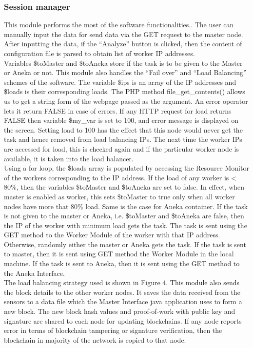 \documentclass[AMA,STIX1COL]{WileyNJD-v2}
\begin{document}
\subsubsection{Session manager}
This module performs the most of the software functionalities.. The user can manually input the data for send data via the GET request to the master node. After inputting the data, if the “Analyze” button is clicked, then the content of configuration file is parsed to obtain list of worker IP addresses. \\
Variables \$toMaster and \$toAneka store if the task is to be given to the Master or Aneka or not. This module also handles the “Fail over” and “Load Balancing” schemes of the software. The variable \$ips is an array of the IP addresses and \$loads is their corresponding loads. The PHP method file\_get\_contents() allows us to get a string form of the webpage passed as the argument. An error operator lets it return FALSE in case of errors. If any HTTP request for load returns FALSE then variable \$my\_var is set to 100, and error message is displayed on the screen. Setting load to 100 has the effect that this node would never get the task and hence removed from load balancing IPs. The next time the worker IPs are accessed for load, this is checked again and if the particular worker node is available, it is taken into the load balancer. \\
Using a for loop, the \$loads array is populated by accessing the Resource Monitor of the workers corresponding to the IP address. If the load of any worker is < 80\%, then the variables \$toMaster and \$toAneka are set to false. In effect, when master is enabled as worker, this sets \$toMaster to true only when all worker nodes have more that 80\% load. Same is the case for Aneka container. If the task is not given to the master or Aneka, i.e. \$toMaster and \$toAneka are false, then the IP of the worker with minimum load gets the task. The task is sent using the GET method to the Worker Module of the worker with that IP address. Otherwise, randomly either the master or Aneka gets the task. If the task is sent to master, then it is sent using GET method the Worker Module in the local machine. If the task is sent to Aneka, then it is sent using the GET method to the Aneka Interface. \\
The load balancing strategy used is shown in Figure 4.
This module also sends the block details to the other worker nodes. It saves the data received from the sensors to a data file which the Master Interface java application uses to form a new block. The new block hash values and proof-of-work with public key and signature are shared to each node for updating blockchains. If any node reports error in terms of blockchain tampering or signature verification, then the blockchain in majority of the network is copied to that node.
\end{document}
